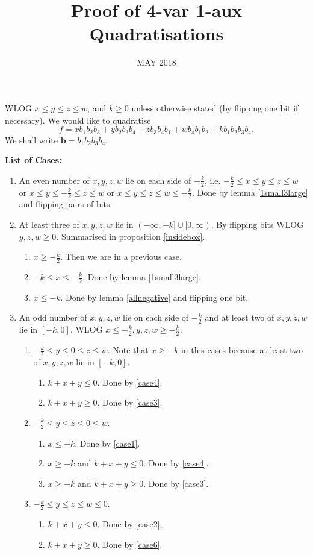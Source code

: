 \documentclass[11pt]{scrartcl}
\newcommand{\vc}[1]{\boldsymbol{#1}}
\begin{document}
\title{Proof of 4-var 1-aux Quadratisations} \date{MAY 2018}

WLOG $x \le y \le z \le w$, and  $k \ge 0$ unless otherwise stated (by flipping one bit if necessary). We would like to quadratise 
\[f = x b_1 b_2 b_3 + y b_2 b_3 b_4 + z b_3 b_4 b_1 + w b_4 b_1 b_2 + k b_1 b_2 b_3 b_4.\] We shall write $\vc b = b_1 b_2 b_3 b_4$.


{\LARGE \textbf{ List of Cases:}}
\begin{enumerate}
	\item An even number of $x, y, z, w$ lie on each side of $-\frac{k}{2}$, i.e. 
		$-\frac{k}{2} \le x \le y \le z \le w$ or $x \le y \le -\frac{k}{2} \le z \le w$ or 
		$x \le y \le z \le w \le -\frac{k}{2}$.
		Done by lemma \ref{1small3large} and flipping pairs of bits.
	\item At least three of $x, y, z, w$ lie in $(-\infty, -k] \cup [0, \infty)$. 
			By flipping bits WLOG $y, z, w \ge 0$. Summarised in proposition \ref{insidebox}.
		\begin{enumerate}
			\item $x \ge -\frac{k}{2}$. Then we are in a previous case.
			\item $-k \le x \le -\frac{k}{2}$. Done by lemma \ref{1small3large}.
			\item $x \le -k$. Done by lemma \ref{allnegative} and flipping one bit.
		\end{enumerate}
	\item An odd number of $x, y, z, w$ lie on each side of $-\frac{k}{2}$ and at least two of $x, y, z, w$ lie in $[-k, 0]$. 
		WLOG $x \le -\frac{k}{2}, y, z, w \ge -\frac{k}{2}$.
		\begin{enumerate}
			\item $-\frac{k}{2} \le y \le 0 \le z \le w$. Note that $x \ge -k$ in this cases 
				because at least two of $x, y, z, w$ lie in $[-k, 0]$.
				\begin{enumerate}
					\item $k+x+y \le 0$. Done by \ref{case4}.
					\item $k+x+y \ge 0$. Done by \ref{case3}.
				\end{enumerate}
			\item $-\frac{k}{2} \le y \le z \le 0 \le w$.
				\begin{enumerate}
					\item $x \le -k$. Done by \ref{case1}.
					\item $x \ge -k$ and $k+x+y \le 0$. Done by \ref{case4}.
					\item $x \ge -k$ and $k+x+y \ge 0$. Done by \ref{case3}.
				\end{enumerate}
			\item $-\frac{k}{2} \le y \le z \le w \le 0$.
				\begin{enumerate}
					\item $k+x+y \le 0$. Done by \ref{case2}.
					\item $k+x+y \ge 0$. Done by \ref{case6}.
				\end{enumerate}
		\end{enumerate}
\end{enumerate}
\end{document}
